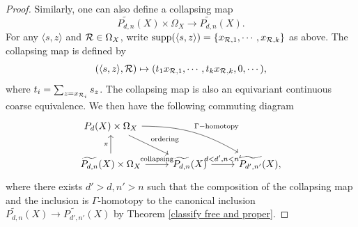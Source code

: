 \documentclass[11pt]{article}
\theoremstyle{definition}
\theoremstyle{plain}
\def\MRdnX{\widetilde{P_{d,n}}(X)}
\def\supp{\textup{supp}}
\def\Ga{\Gamma}
\begin{document}
\begin{proof}
Similarly, one can also define a collapsing map
$$\MRdnX\times\Omega_{X}\to\MRdnX.$$
For any $\langle s,z\rangle$ and $\mathcal R\in\Omega_X$, write $\supp(\langle s,z\rangle)=\{x_{\R,1},\cdots,x_{\R,k}\}$ as above. The collapsing map is defined by
$$(\langle s,z\rangle,\mathcal R)\mapsto (t_{1}x_{\mathcal R,1},\cdots,t_{k}x_{\mathcal R,k},0,\cdots),$$
where $t_i=\sum_{z=x_{\mathcal R_i}} s_z$. The collapsing map is also an equivariant continuous coarse equivalence. We then have the following commuting diagram
\begin{equation}\label{collapsing-ordering}\begin{tikzcd}
P_d(X)\times\Omega_X \arrow[rd, "\text{ordering}"] \arrow[rrd, bend left=15,"\Ga-\text{homotopy}"] &                            &   \\
\MRdnX\times\Omega_X \arrow[r, "\text{collapsing}"] \arrow[u, "\pi"]       & \MRdnX \arrow[r, "{d<d',n<n'}"] & \widetilde{P_{d',n'}}(X),
\end{tikzcd}\end{equation}
where there exists $d'>d,n'>n$ such that the composition of the collapsing map and the inclusion is $\Ga$-homotopy to the canonical inclusion $\MRdnX\to\widetilde{P_{d',n'}}(X)$ by Theorem \ref{classify free and proper}.


\end{proof}
\end{document}
